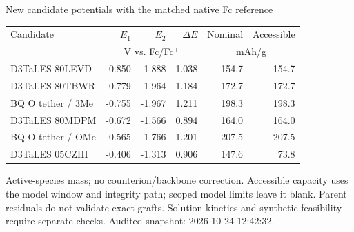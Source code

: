 \begin{frame}{New candidate potentials with the matched native Fc reference}
\scriptsize\renewcommand{\arraystretch}{1.25}\centering
\begin{tabular}{@{}p{4.7cm}rrrrr@{}}\toprule
Candidate & $E_1$ & $E_2$ & $\Delta E$ & Nominal & Accessible \\
& \multicolumn{3}{c}{V vs. Fc/Fc$^+$} & \multicolumn{2}{c}{mAh/g} \\ \midrule
D3TaLES 80LEVD & -0.850 & -1.888 & 1.038 & 154.7 & 154.7 \\
D3TaLES 80TBWR & -0.779 & -1.964 & 1.184 & 172.7 & 172.7 \\
BQ O tether / 3Me & -0.755 & -1.967 & 1.211 & 198.3 & 198.3 \\
D3TaLES 80MDPM & -0.672 & -1.566 & 0.894 & 164.0 & 164.0 \\
BQ O tether / OMe & -0.565 & -1.766 & 1.201 & 207.5 & 207.5 \\
D3TaLES 05CZHI & -0.406 & -1.313 & 0.906 & 147.6 & 73.8 \\
\bottomrule\end{tabular}\par
\vspace{1ex}\raggedright
\footnotesize Active-species mass; no counterion/backbone correction. Accessible capacity uses the model window and integrity path; scoped model limits leave it blank.
\vspace{1ex}\scriptsize Parent residuals do not validate exact grafts. Solution kinetics and synthetic feasibility require separate checks.
\vfill\scriptsize Audited snapshot: 2026-10-24 12:42:32.
\end{frame}
